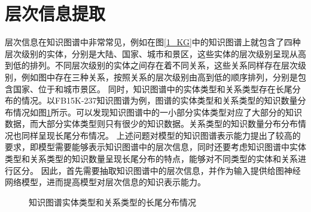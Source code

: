 \documentclass[algorithmlist, AutoFakeBold, AutoFakeSlant, figurelist, tablelist, nomlist, engineering]{seuthesix}
\begin{document}
\section{层次信息提取}
层次信息在知识图谱中非常常见，例如在图\ref{1_KG}中的知识图谱上就包含了四种层次级别的实体，分别是大陆、国家、城市和景区，这些实体的层次级别呈现从高到低的排列。不同层次级别的实体之间存在着不同关系，这些关系同样存在层次级别，例如图中存在三种关系，按照关系的层次级别由高到低的顺序排列，分别是包含国家、位于和城市景区。
同时，知识图谱中的实体类型和关系类型存在长尾分布的情况。以FB15K-237知识图谱为例，图谱的实体类型和关系类型的知识数量分布情况如图\ref{2_LongTail}所示。可以发现知识图谱中的一小部分实体类型对应了大部分的知识数据，而大部分实体类型则只有很少的知识数据。关系类型的知识数量分布分布情况也同样呈现长尾分布情况。
上述问题对模型的知识图谱表示能力提出了较高的要求，即模型需要能够表示知识图谱中的层次信息，同时还要考虑知识图谱中实体类型和关系类型的知识数量呈现长尾分布的特点，能够对不同类型的实体和关系进行区分。
因此，首先需要抽取知识图谱中的层次信息，并作为输入提供给图神经网络模型，进而提高模型对层次信息的知识表示能力。
\begin{figure}
  \centering
  \caption{知识图谱实体类型和关系类型的长尾分布情况}
  \label{2_LongTail}
\end{figure}

\end{document}
